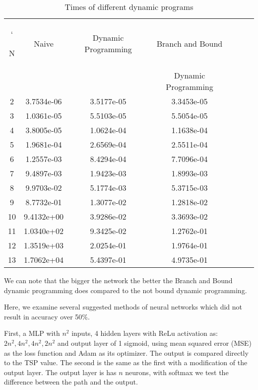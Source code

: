 \documentclass{iitthesis}
\begin{document}
\begin{table}[ht]
\caption{Times of different dynamic programs }   %
\centering                          %
\begin{tabular}{c c c c c c c}            %
\hline\hline     `                   %

N& Naive &  Dynamic Programming  &Branch and Bound \\ & & &Dynamic Programming \\ [0.3ex] %
\hline                              %
2&3.7534e-06&3.5177e-05&3.3453e-05\\
3&1.0361e-05&5.5103e-05&5.5054e-05\\
4&3.8005e-05&1.0624e-04&1.1638e-04\\
5&1.9681e-04&2.6569e-04&2.5511e-04\\
6&1.2557e-03&8.4294e-04&7.7096e-04\\
7&9.4897e-03&1.9423e-03&1.8993e-03\\
8&9.9703e-02&5.1774e-03&5.3715e-03\\
9&8.7732e-01&1.3077e-02&1.2818e-02\\
10&9.4132e+00&3.9286e-02&3.3693e-02\\
11&1.0340e+02&9.3425e-02&1.2762e-01\\
12&1.3519e+03&2.0254e-01&1.9764e-01\\
13&1.7062e+04&5.4397e-01&4.9735e-01\\ [1ex]         %
\hline                              %
\end{tabular}
\label{table:nonlin}                %
\end{table}
We can note that the bigger the network the better the Branch and Bound dynamic programming does compared to the not bound dynamic programming.  

 Here, we examine several suggested methods of neural networks which did not result in accuracy over 50\%.
 
 First, a MLP with $n^2$ inputs, 4 hidden layers with ReLu activation as: $2n^2, 4n^2, 4n^2, 2n^2$ and output layer of 1 sigmoid, using mean squared error (MSE) as the loss function and Adam as its optimizer. The output is compared directly to the TSP value.  The second is the same as the first with a modification of the output layer. The output layer is has $n$ neurons, with softmax we test the difference between the path and the output. 
 
\end{document}

